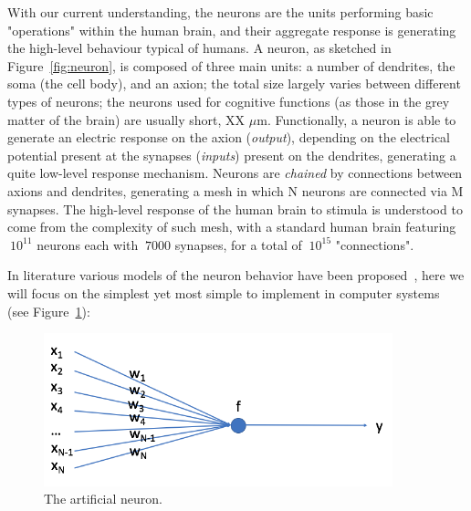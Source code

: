  With our current understanding, the neurons are the units performing basic "operations" within the human brain, and their aggregate response is generating the high-level behaviour typical of humans.
 A neuron, as sketched in Figure~\ref{fig:neuron}, is composed of three main units: a number of dendrites, the soma (the cell body), and an axion; the total size largely varies between different types of neurons; the neurons used for cognitive functions (as those in the grey matter of the brain) are usually short, XX $\mu$m.
Functionally, a neuron is able to generate an electric response on the axion (\emph{output}), depending on the electrical potential present at the synapses (\emph{inputs}) present on the dendrites, generating a quite low-level response mechanism. Neurons are \emph{chained} by connections between axions and dendrites, generating a mesh in which N neurons are connected via M synapses.
 The high-level response of the human brain to stimula is understood to come from the complexity of such mesh, with a standard human brain featuring $~10^{11}$ neurons each with $~7000$ synapses, for a total of $~10^{15}$ "connections".

 In literature various models of the neuron behavior have been proposed~\cite{neuronbe1, neuronbe2, neuronbe3}, %
 here we will focus on the simplest yet most simple to implement in computer systems~\cite{artificialneuron} (see Figure~\ref{fig:artificialneuron}): %
 
 \begin{figure}[h]
    \centering
    \hfill
        \includegraphics[width=0.9\textwidth]{images/artificialneuron.png}
     \caption{The artificial neuron.}
     \label{fig:artificialneuron}

\end{figure}
 
